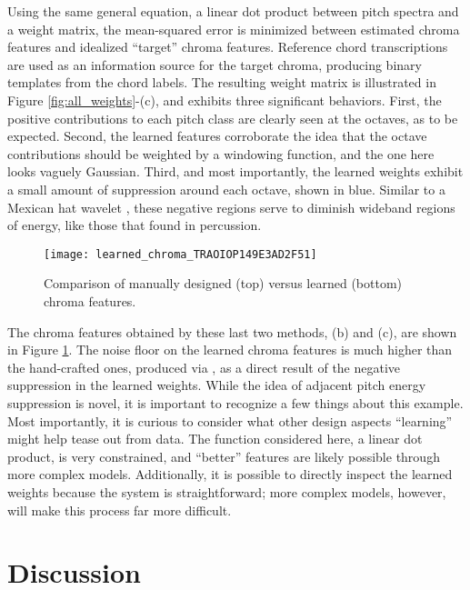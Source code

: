 Using the same general equation, a linear dot product between pitch spectra and a weight matrix, the mean-squared error is minimized between estimated chroma features and idealized ``target'' chroma features.
Reference chord transcriptions are used as an information source for the target chroma, producing binary templates from the chord labels.
The resulting weight matrix is illustrated in Figure \ref{fig:all_weights}-(c), and exhibits three significant behaviors.
First, the positive contributions to each pitch class are clearly seen at the octaves, as to be expected.
Second, the learned features corroborate the idea that the octave contributions should be weighted by a windowing function, and the one here looks vaguely Gaussian.
Third, and most importantly, the learned weights exhibit a small amount of suppression around each octave, shown in blue.
Similar to a Mexican hat wavelet \cite{mexihat}, these negative regions serve to diminish wideband regions of energy, like those that found in percussion.


\begin{figure}
\begin{centering}
\texttt{[image: learned\_chroma\_TRAOIOP149E3AD2F51]}
\caption{Comparison of manually designed (top) versus learned (bottom) chroma features.}
\label{fig:learned_chroma}
\end{centering}
\end{figure}

The chroma features obtained by these last two methods, (b) and (c), are shown in Figure \ref{fig:learned_chroma}.
The noise floor on the learned chroma features is much higher than the hand-crafted ones, produced via \cite{Cho2014}, as a direct result of the negative suppression in the learned weights.
While the idea of adjacent pitch energy suppression is novel, it is important to recognize a few things about this example.
Most importantly, it is curious to consider what other design aspects ``learning'' might help tease out from data.
The function considered here, a linear dot product, is very constrained, and ``better'' features are likely possible through more complex models.
Additionally, it is possible to directly inspect the learned weights because the system is straightforward; more complex models, however, will make this process far more difficult.


\section{Discussion}

